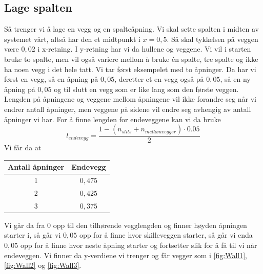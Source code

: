 \documentclass[reprint,english,notitlepage]{revtex4-2}  %
\begin{document}
\subsection{Lage spalten} \label{ssec:Spalte}
Så trenger vi å lage en vegg og en spalteåpning. Vi skal sette spalten i midten av systemet vårt, altså har den et midtpunkt i $x=0,5$. Så skal tykkelsen på veggen være $0,02$ i x-retning. I y-retning har vi da hullene og veggene. Vi vil i starten bruke to spalte, men vil også variere mellom å bruke én spalte, tre spalte og ikke ha noen vegg i det hele tatt. Vi tar først eksempelet med to åpninger. Da har vi først en vegg, så en åpning på $0,05$, deretter et en vegg også på $0,05$, så en ny åpning på $0,05$ og til slutt en vegg som er like lang som den første veggen. Lengden på åpningene og veggene mellom åpningene vil ikke forandre seg når vi endrer antall åpninger, men veggene på sidene vil endre seg avhengig av antall åpninger vi har. For å finne lengden for endeveggene kan vi da bruke
$$
l_{endevegg}=\frac{1-(n_{slits}+n_{mellomvegger})\cdot 0.05}{2}
$$
Vi får da at
\begin{table}[H]
	\begin{tabular}{|c|c|}
		\hline
		Antall åpninger & Endevegg \\
		\hline 
		1 & $0,475$ \\
		\hline
		2& $0,425$ \\ \hline 
		3& $0,375$ \\ \hline
		
	\end{tabular}
\end{table}
Vi går da fra 0 opp til den tilhørende vegglengden og finner høyden åpningen starter i, så går vi $0,05$ opp for å finne hvor skilleveggen starter, så går vi enda $0,05$ opp for å finne hvor neste åpning starter og fortsetter slik for å få til vi når endeveggen. Vi finner da y-verdiene vi trenger og får vegger som i \autoref{fig:Wall1}, \autoref{fig:Wall2} og \autoref{fig:Wall3}.
\end{document}
